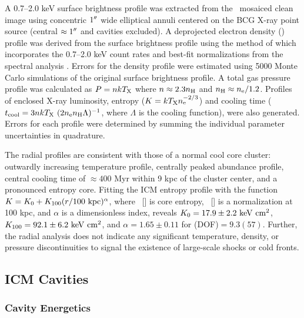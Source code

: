 \documentclass[apjpt4]{aastex}
\begin{document}
A 0.7--2.0 keV surface brightness profile was extracted from the
\cxo\ mosaiced clean image using concentric $1\rm{^\prime}\hskip -0.1em\rm{^\prime}$ wide elliptical
annuli centered on the BCG X-ray point source (central $\approx
1\rm{^\prime}\hskip -0.1em\rm{^\prime}$ and cavities excluded). A deprojected electron density
(\nelec) profile was derived from the surface brightness profile using
the method of \citet{kriss83} which incorporates the 0.7--2.0 keV
count rates and best-fit normalizations from the spectral analysis
\citep[see][for details]{accept}. Errors for the density profile were
estimated using 5000 Monte Carlo simulations of the original surface
brightness profile. A total gas pressure profile was calculated as $P
= n kT_{\rm{X}}$ where $n \approx 2.3 n_{\rm{H}}$ and $n_{\rm{H}} \approx
n_{\rm{e}}/1.2$. Profiles of enclosed X-ray luminosity, entropy ($K = kT_{\rm{X}}
n_{\rm{e}}^{-2/3}$) and cooling time ($t_{\rm{cool}} = 3 n kT_{\rm{X}}~(2 n_{\rm{e}} n_{\rm{H}}
\Lambda)^{-1}$, where $\Lambda$ is the cooling function), were also
generated. Errors for each profile were determined by summing the
individual parameter uncertainties in quadrature.

The radial profiles are consistent with those of a normal cool core
cluster: outwardly increasing temperature profile, centrally peaked
abundance profile, central cooling time of $\approx 400$ Myr within 9
kpc of the cluster center, and a pronounced entropy core. Fitting the
ICM entropy profile with the function $K = K_0 +K_{100} (r/100
~\mbox{\ensuremath{\rm{kpc}}})^{\alpha}$, where \kna\ [\ent] is core entropy, \khun\ [\ent] is
a normalization at 100 kpc, and $\alpha$ is a dimensionless index,
reveals $K_0 = 17.9 \pm 2.2 ~\rm{\mbox{\ensuremath{\rm{keV}}}~\ensuremath{\rm{\mbox{\ensuremath{\rm{cm}}}^2}}}$, $K_{100} = 92.1 \pm 6.2 ~\rm{\mbox{\ensuremath{\rm{keV}}}~\ensuremath{\rm{\mbox{\ensuremath{\rm{cm}}}^2}}}$, and
$\alpha = 1.65 \pm 0.11$ for \chisq(DOF)$ = 9.3(57)$. Further, the
radial analysis does not indicate any significant temperature,
density, or pressure discontinuities to signal the existence of
large-scale shocks or cold fronts.

\subsection{ICM Cavities}
\label{sec:cavities}

\subsubsection{Cavity Energetics}
\label{sec:ecav}
\end{document}
